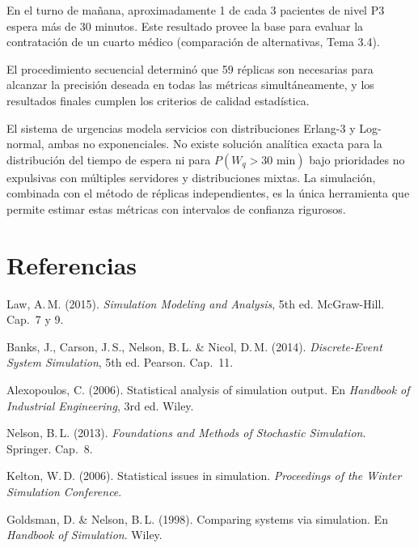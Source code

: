 \documentclass[11pt, letterpaper]{article}
\begin{document}
\begin{resultadobox}
En el turno de mañana, aproximadamente 1 de cada 3 pacientes de nivel P3 espera más de 30 minutos. Este resultado provee la base para evaluar la contratación de un cuarto médico (comparación de alternativas, Tema 3.4).

El procedimiento secuencial determinó que 59 réplicas son necesarias para alcanzar la precisión deseada en todas las métricas simultáneamente, y los resultados finales cumplen los criterios de calidad estadística.
\end{resultadobox}

\begin{notabox}
El sistema de urgencias modela servicios con distribuciones Erlang-3 y Log-normal, ambas no exponenciales. No existe solución analítica exacta para la distribución del tiempo de espera ni para $P(W_q>30\text{ min})$ bajo prioridades no expulsivas con múltiples servidores y distribuciones mixtas. La simulación, combinada con el método de réplicas independientes, es la única herramienta que permite estimar estas métricas con intervalos de confianza rigurosos.
\end{notabox}

\section*{Referencias}

\begin{enumerate}[label={[\arabic*]}]
    \item Law, A.\,M. (2015). \textit{Simulation Modeling and Analysis}, 5th ed. McGraw-Hill. Cap.~7 y 9.
    \item Banks, J., Carson, J.\,S., Nelson, B.\,L. \& Nicol, D.\,M. (2014). \textit{Discrete-Event System Simulation}, 5th ed. Pearson. Cap.~11.
    \item Alexopoulos, C. (2006). Statistical analysis of simulation output. En \textit{Handbook of Industrial Engineering}, 3rd ed. Wiley.
    \item Nelson, B.\,L. (2013). \textit{Foundations and Methods of Stochastic Simulation}. Springer. Cap.~8.
    \item Kelton, W.\,D. (2006). Statistical issues in simulation. \textit{Proceedings of the Winter Simulation Conference}.
    \item Goldsman, D. \& Nelson, B.\,L. (1998). Comparing systems via simulation. En \textit{Handbook of Simulation}. Wiley.
\end{enumerate}
\end{document}
